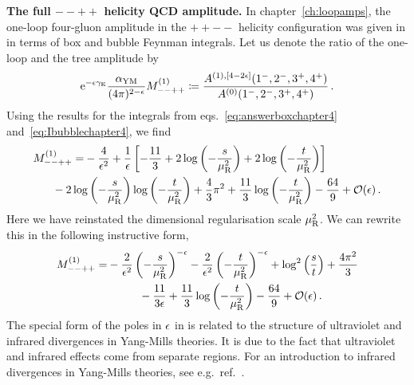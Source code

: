 \begin{svgraybox}
{\bf The full $--++$ helicity QCD amplitude.}
In chapter~\ref{ch:loopamps}, the one-loop four-gluon amplitude in the $++--$ helicity configuration was given in  in terms of box and bubble Feynman integrals.
Let us denote the ratio of the one-loop and the tree amplitude by
\begin{align}
 \mathrm{e}^{-\epsilon \gamma_{\rm E}}  \frac{\alpha_{\rm YM}}{(4 \pi)^{2-\epsilon}} M_{--++}^{(1)} \coloneqq  \frac{ A^{(1),[4-2\epsilon]}(1^-,2^-,3^+,4^+) }{A^{(0)}(1^-,2^-,3^+,4^+) }\,. 
\end{align}
%
Using the results for the integrals from eqs.~\eqref{eq:answerboxchapter4} and~\eqref{eq:Ibubblechapter4},
we find
\begin{align}\label{eq:finalresultQCDamplitude}
 M_{--++}^{(1)} =
&  - \frac{4}{\eps^2} +\frac{1}{\eps} \left[ -\frac{11}{3} +2  \log\left(- \frac{s}{\mu_{\rm R}^2} \right) + 2  \log\left(-\frac{t}{\mu_{\rm R}^2}\right) \right]   \\
&\hspace{-1cm}- 2  \log\left(-\frac{s}{\mu_{\rm R}^2}\right) \log\left(-\frac{t}{\mu_{\rm R}^2}\right) + \frac{4}{3}\pi^2  + \frac{11}{3} \log\left(-\frac{t}{\mu_{\rm R}^2}\right) - \frac{64}{9}  + {\cal O}(\eps) \nonumber
\,.
\end{align}
Here we have reinstated the dimensional regularisation scale $\mu_{\rm R}^2$.
We can rewrite this in the following instructive form,
\begin{align} \label{eq:finalresultQCDamplitude2}
\begin{aligned}
M_{--++}^{(1)}  =
& - \frac{2}{\epsilon^2}  \left(-\frac{s}{\mu_{\rm R}^2}\right)^{-\epsilon} - \frac{2}{\epsilon^2}  \left(-\frac{t}{\mu_{\rm R}^2}\right)^{-\epsilon} + \log^2 \left(\frac{s}{t}\right) +  \frac{4 \pi^2}{3}  \\
& \hspace{1cm}- \frac{11}{3 \epsilon}  + \frac{11}{3} \log\left(-\frac{t}{\mu_{\rm R}^2}\right) - \frac{64}{9} + {\cal O}(\epsilon) \,.
\end{aligned}
\end{align}
The special form of the poles in $\epsilon$ in  is related to the structure of ultraviolet and infrared divergences in Yang-Mills theories. 
It is due to the fact that ultraviolet and infrared effects come from separate regions. 
For an introduction to infrared divergences in Yang-Mills theories, see e.g.\ ref.~\cite{ch4Agarwal:2021ais}. 
\end{svgraybox}


